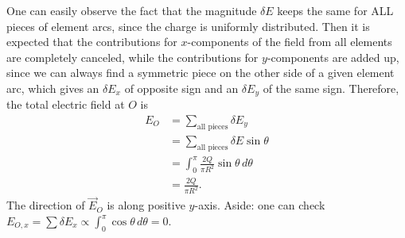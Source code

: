 \documentclass{esg8022pset}
\begin{document}
\begin{solution}
  One can easily observe the fact that the magnitude $\delta E$ keeps the same for ALL pieces of element arcs, since the charge is uniformly distributed. Then it is expected that the contributions for $x$-components of the field from all elements are completely canceled, while the contributions for $y$-components are added up, since we can always find a symmetric piece on the other side of a given element arc, which gives an $\delta E_x$ of opposite sign and an $\delta E_y$ of the same sign.  Therefore, the total electric field at $O$ is
  \begin{align*}
    E_O & = \sum_{\text{all pieces}} \delta E_y \\
        & = \sum_{\text{all pieces}} \delta E\sin\theta \\
        & = \int_0^\pi \frac{2Q}{\pi R^2}\sin\theta\,d\theta \\
        & = \frac{2Q}{\pi R^2}.
  \end{align*}
  The direction of $\vec E_O$ is along positive $y$-axis. Aside: one can check $E_{O,x} = \sum \delta E_x \propto \int_0^\pi \cos\theta\,d\theta = 0$.
\end{solution}
\end{document}
